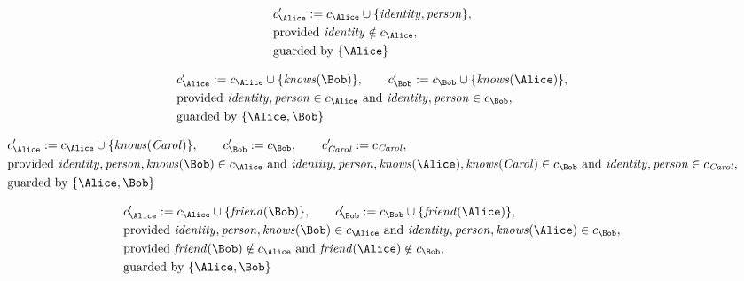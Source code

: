 \begin{align*}
&
c'_
{
\Alice
}
 := 
c_
{
\Alice
}
 \cup 
\{
\mathit{\detokenize{
identity
}}
,
\mathit{\detokenize{
person
}}
\}
,\\
&
\text{provided } 
\mathit{\detokenize{
identity
}}
 \notin c_
{
\Alice
}
,\\
&
\text{guarded by } \{
\Alice
\}
\end{align*}

\begin{align*}
&
c'_
{
\Alice
}
 := 
c_
{
\Alice
}
 \cup 
\{
\mathit{\detokenize{
knows
}}
(
\Bob
)
\}
, \qquad 
c'_
{
\Bob
}
 := 
c_
{
\Bob
}
 \cup 
\{
\mathit{\detokenize{
knows
}}
(
\Alice
)
\}
,\\
&
\text{provided } 
\mathit{\detokenize{
identity
}}
,
\mathit{\detokenize{
person
}}
 \in c_
{
\Alice
}
 \text{ and } 
\mathit{\detokenize{
identity
}}
,
\mathit{\detokenize{
person
}}
 \in c_
{
\Bob
}
,\\
&
\text{guarded by } \{
\Alice
,
\Bob
\}
\end{align*}

\begin{align*}
&
c'_
{
\Alice
}
 := 
c_
{
\Alice
}
 \cup 
\{
\mathit{\detokenize{
knows
}}
(
\mathit{Carol}
)
\}
, \qquad 
c'_
{
\Bob
}
 := 
c_
{
\Bob
}
, \qquad 
c'_
{
\mathit{Carol}
}
 := 
c_
{
\mathit{Carol}
}
,\\
&
\text{provided } 
\mathit{\detokenize{
identity
}}
,
\mathit{\detokenize{
person
}}
,
\mathit{\detokenize{
knows
}}
(
\Bob
)
 \in c_
{
\Alice
}
 \text{ and } 
\mathit{\detokenize{
identity
}}
,
\mathit{\detokenize{
person
}}
,
\mathit{\detokenize{
knows
}}
(
\Alice
)
,
\mathit{\detokenize{
knows
}}
(
\mathit{Carol}
)
 \in c_
{
\Bob
}
 \text{ and } 
\mathit{\detokenize{
identity
}}
,
\mathit{\detokenize{
person
}}
 \in c_
{
\mathit{Carol}
}
,\\
&
\text{guarded by } \{
\Alice
,
\Bob
\}
\end{align*}

\begin{align*}
&
c'_
{
\Alice
}
 := 
c_
{
\Alice
}
 \cup 
\{
\mathit{\detokenize{
friend
}}
(
\Bob
)
\}
, \qquad 
c'_
{
\Bob
}
 := 
c_
{
\Bob
}
 \cup 
\{
\mathit{\detokenize{
friend
}}
(
\Alice
)
\}
,\\
&
\text{provided } 
\mathit{\detokenize{
identity
}}
,
\mathit{\detokenize{
person
}}
,
\mathit{\detokenize{
knows
}}
(
\Bob
)
 \in c_
{
\Alice
}
 \text{ and } 
\mathit{\detokenize{
identity
}}
,
\mathit{\detokenize{
person
}}
,
\mathit{\detokenize{
knows
}}
(
\Alice
)
 \in c_
{
\Bob
}
,\\
&
\text{provided } 
\mathit{\detokenize{
friend
}}
(
\Bob
)
 \notin c_
{
\Alice
}
 \text{ and } 
\mathit{\detokenize{
friend
}}
(
\Alice
)
 \notin c_
{
\Bob
}
,\\
&
\text{guarded by } \{
\Alice
,
\Bob
\}
\end{align*}
